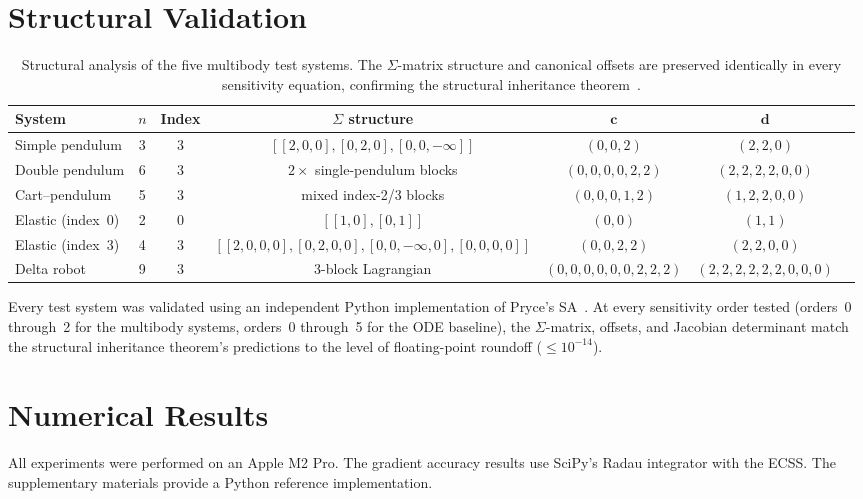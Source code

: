 \documentclass[12pt,a4paper]{article}
\theoremstyle{definition}
\theoremstyle{plain}
\newcommand{\vc}{\mathbf{c}}
\newcommand{\vd}{\mathbf{d}}
\begin{document}
\section{Structural Validation}

\begin{table}[htbp]
  \centering
  \caption{Structural analysis of the five multibody test systems. The $\Sigma$-matrix structure and canonical offsets are preserved identically in every sensitivity equation, confirming the structural inheritance theorem~\cite{cao2026structural}.}
  \label{tab:structural}
  \begin{tabular}{lcccccl}
    \toprule
    System & $n$ & Index & $\Sigma$ structure & $\vc$ & $\vd$ \\
    \midrule
    Simple pendulum & 3 & 3 & $[[2,0,0],[0,2,0],[0,0,-\infty]]$ & $(0,0,2)$ & $(2,2,0)$ \\
    Double pendulum & 6 & 3 & $2\times$ single-pendulum blocks & $(0,0,0,0,2,2)$ & $(2,2,2,2,0,0)$ \\
    Cart--pendulum & 5 & 3 & mixed index-2/3 blocks & $(0,0,0,1,2)$ & $(1,2,2,0,0)$ \\
    Elastic (index~0) & 2 & 0 & $[[1,0],[0,1]]$ & $(0,0)$ & $(1,1)$ \\
    Elastic (index~3) & 4 & 3 & $[[2,0,0,0],[0,2,0,0],[0,0,-\infty,0],[0,0,0,0]]$ & $(0,0,2,2)$ & $(2,2,0,0)$ \\
    Delta robot & 9 & 3 & 3-block Lagrangian & $(0,0,0,0,0,0,2,2,2)$ & $(2,2,2,2,2,2,0,0,0)$ \\
    \bottomrule
  \end{tabular}
\end{table}

Every test system was validated using an independent Python implementation of Pryce's SA~\cite{pryce2001simple}. At every sensitivity order tested (orders~0 through~2 for the multibody systems, orders~0 through~5 for the ODE baseline), the $\Sigma$-matrix, offsets, and Jacobian determinant match the structural inheritance theorem's predictions to the level of floating-point roundoff ($\le 10^{-14}$).

\section{Numerical Results}

All experiments were performed on an Apple M2 Pro. The gradient accuracy results use SciPy's Radau integrator with the ECSS. The supplementary materials provide a Python reference implementation.
\end{document}

